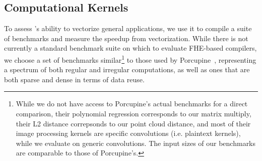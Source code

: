 \subsection{Computational Kernels}

To assess \system's ability to vectorize general applications, we use it to compile a suite of benchmarks and measure the speedup from vectorization.
While there is not currently a standard benchmark suite on which to evaluate FHE-based compilers, we choose a set of benchmarks similar\footnote{While we do not have access to Porcupine's actual benchmarks for a direct comparison, their polynomial regression corresponds to our matrix multiply, their L2 distance correpsonds to our point cloud distance, and most of their image processing kernels are specific convolutions (i.e. plaintext kernels), while we evaluate on generic convolutions. The input sizes of our benchmarks are comparable to those of Porcupine's.} to those used by Porcupine~\cite{Porcupine}, representing a spectrum of both regular and irregular computations, as well as ones that are both sparse and dense in terms of data reuse.



